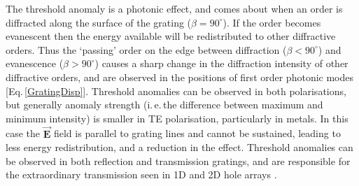 The threshold anomaly is a photonic effect, and comes about when an order is diffracted along the surface of the grating ($\beta=90^{\circ}$). If the order becomes evanescent then the energy available will be redistributed to other diffractive orders. Thus the `passing' order on the edge between diffraction ($\beta<90^{\circ}$) and evanescence ($\beta>90^{\circ}$) causes a sharp change in the diffraction intensity of other diffractive orders, and are observed in the positions of first order photonic modes [Eq.\,\ref{GratingDisp}]. Threshold anomalies can be observed in both polarisations, but generally anomaly strength (i.\,e.\,the difference between maximum and minimum intensity) is smaller in TE polarisation, particularly in metals. In this case the $\vec{\mathbf{E}}$ field is parallel to grating lines and cannot be sustained, leading to less energy redistribution, and a reduction in the effect. Threshold anomalies can be observed in both reflection and transmission gratings, and are responsible for the extraordinary transmission seen in 1D and 2D hole arrays \cite{Fano1941, Hessel1965, Lee2005, Lochbihler1994, Ritchie1968, Treacy2002, Watts1997}.

